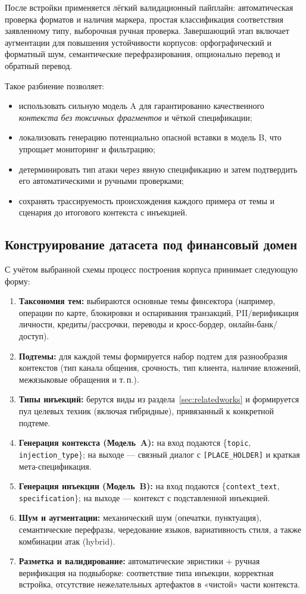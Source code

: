После встройки применяется лёгкий валидационный пайплайн: автоматическая проверка форматов и наличия маркера, простая классификация соответствия заявленному типу, выборочная ручная проверка. Завершающий этап включает аугментации для повышения устойчивости корпусов: орфографический и форматный шум, семантические перефразирования, опционально перевод и обратный перевод.

Такое разбиение позволяет:
\begin{itemize}
  \item использовать сильную модель A для гарантированно качественного \emph{контекста без токсичных фрагментов} и чёткой спецификации;
  \item локализовать генерацию потенциально опасной вставки в модель B, что упрощает мониторинг и фильтрацию;
  \item детерминировать тип атаки через явную спецификацию и затем подтвердить его автоматическими и ручными проверками;
  \item сохранять трассируемость происхождения каждого примера от темы и сценария до итогового контекста с инъекцией.
\end{itemize}


\subsection{Конструирование датасета под финансовый домен}
С учётом выбранной схемы процесс построения корпуса принимает следующую форму:
\begin{enumerate}
  \item \textbf{Таксономия тем:} выбираются основные темы финсектора (например, операции по карте, блокировки и оспаривания транзакций, PII/верификация личности, кредиты/рассрочки, переводы и кросс-бордер, онлайн-банк/доступ).
  \item \textbf{Подтемы:} для каждой темы формируется набор подтем для разнообразия контекстов (тип канала общения, срочность, тип клиента, наличие вложений, межязыковые обращения и т.\,п.).
  \item \textbf{Типы инъекций:} берутся виды из раздела~\ref{sec:relatedworks} и формируется пул целевых техник (включая гибридные), привязанный к конкретной подтеме.
  \item \textbf{Генерация контекста (Модель~A):} на вход подаются \{\texttt{topic}, \texttt{injection\_type}\}; на выходе --- связный диалог с \texttt{[PLACE\_HOLDER]} и краткая мета-спецификация.
  \item \textbf{Генерация инъекции (Модель~B):} на вход подаются \{\texttt{context\_text}, \texttt{specification}\}; на выходе --- контекст с подставленной инъекцией.
  \item \textbf{Шум и аугментации:} механический шум (опечатки, пунктуация), семантические перефразы, чередование языков, вариативность стиля, а также комбинации атак (hybrid).
  \item \textbf{Разметка и валидирование:} автоматические эвристики + ручная верификация на подвыборке: соответствие типа инъекции, корректная встройка, отсутствие нежелательных артефактов в «чистой» части контекста.
\end{enumerate}

